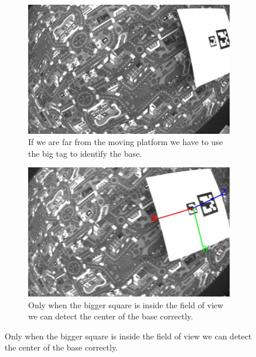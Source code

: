 \begin{figure}[!htbp]
  \centering
   \begin{subfigure}[b]{0.45\textwidth}
        \includegraphics[width=\textwidth]{img/frame0.jpg}
        \caption{If we are far from the moving platform we have to use the big tag to identify the base.}
        \label{fig:one}
   \end{subfigure}\hfill
   \begin{subfigure}[b]{0.45\textwidth}
        \includegraphics[width=\textwidth]{img/frame1.jpg}
        \caption{Only when the bigger square is inside the field of view we can detect the center of the base correctly.}
        \label{fig:two}
   \end{subfigure}
   

\end{figure}
